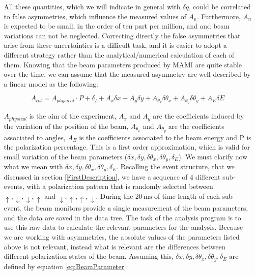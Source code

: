 All these quantities, which we will indicate in general with $\delta q$, could be correlated to false asymmetries, which influence the measured values of $A_{n}$. Furthermore, $A_{n}$ is expected to be small, in the order of ten part per million, and and beam variations can not be neglected. Correcting directly the false asymmetries that arise from these uncertainties is a difficult task, and it is easier to adopt a different strategy rather than the analytical/numerical calculation of each of them. Knowing that the beam parameters produced by MAMI are quite stable over the time, we can assume that the measured asymmetry are well described by a linear model as the following:

\begin{equation}
A_{tot} = A_{physical} \cdot P + \delta_{I} + A_{x} \delta x + A_{y} \delta y + A_{\theta_{x}} \delta \theta_{x} + A_{\theta_{y}} \delta \theta_{y}+ A_{E} \delta E 
\end{equation}

$A_{physical}$ is the aim of the experiment, $A_{x}$ and $A_{y}$ are the coefficients induced by the variation of the position of the beam, $A_{\theta_{x}}$ and $A_{\theta_{y}}$ are the coefficients associated to angles, $A_{E}$ is the coefficients associated to the beam energy and P is the polarization percentage. 
This is a first order approximation, which is valid for small variation of the beam parameters ($\delta x, \delta y, \delta \theta_{x}, \delta \theta_{y}, \delta_{E}$).
We must clarify now what we mean with $\delta x, \delta y, \delta \theta_{x}, \delta \theta_{y}, \delta_{E}$. Recalling the event structure, that we discussed in section \ref{FirstDescription}, we have a sequence of 4 different sub-events, with a polarization pattern that is randomly selected between $\uparrow,\downarrow,\downarrow, \uparrow$ and $\downarrow,\uparrow,\uparrow,\downarrow$. During the $\SI{20}{\milli \second}$ of time length of each sub-event, the beam monitors provide a single measurement of the beam parameters, and the data are saved in the data tree. The task of the analysis program is to use this raw data to calculate the relevant parameters for the analysis. Because we are working with asymmetries, the absolute values of the parameters listed above is not relevant, instead what is relevant are the differences between different polarization states of the beam. Assuming this, $\delta x, \delta y, \delta \theta_{x}, \delta \theta_{y}, \delta_{E}$ are defined by equation \ref{eq:BeamParameter}:

